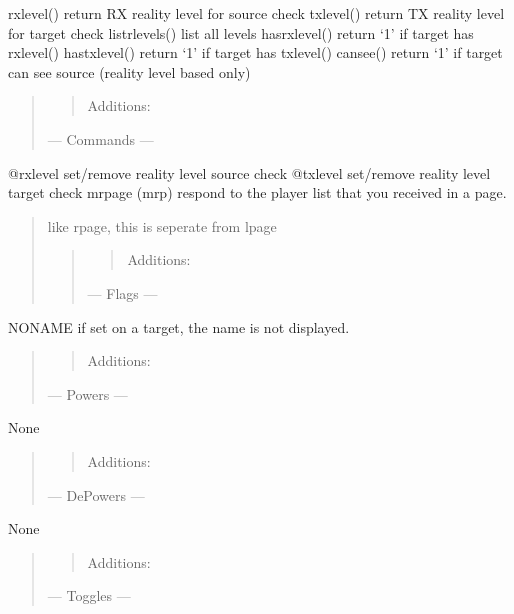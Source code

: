 \documentclass[letterpaper,10pt,english]{sphinxmanual}
\begin{document}
\sphinxAtStartPar
rxlevel() \sphinxhyphen{} return RX reality level for source check
txlevel() \sphinxhyphen{} return TX reality level for target check
listrlevels() \sphinxhyphen{} list all levels
hasrxlevel() \sphinxhyphen{} return ‘1’ if target has rxlevel()
hastxlevel() \sphinxhyphen{} return ‘1’ if target has txlevel()
cansee() \sphinxhyphen{} return ‘1’ if target can see source (reality level based only)
\begin{quote}
\begin{quote}

\sphinxAtStartPar
Additions:
\end{quote}

\sphinxAtStartPar
— Commands —
\end{quote}

\sphinxAtStartPar
@rxlevel \sphinxhyphen{} set/remove reality level source check
@txlevel \sphinxhyphen{} set/remove reality level target check
mrpage (mrp) \sphinxhyphen{} respond to the player list that you received in a page.
\begin{quote}

\sphinxAtStartPar
like rpage, this is seperate from lpage
\begin{quote}
\begin{quote}

\sphinxAtStartPar
Additions:
\end{quote}

\sphinxAtStartPar
— Flags —
\end{quote}
\end{quote}

\sphinxAtStartPar
NONAME \sphinxhyphen{} if set on a target, the name is not displayed.
\begin{quote}
\begin{quote}

\sphinxAtStartPar
Additions:
\end{quote}

\sphinxAtStartPar
— Powers —
\end{quote}

\sphinxAtStartPar
None
\begin{quote}
\begin{quote}

\sphinxAtStartPar
Additions:
\end{quote}

\sphinxAtStartPar
— De\sphinxhyphen{}Powers —
\end{quote}

\sphinxAtStartPar
None
\begin{quote}
\begin{quote}

\sphinxAtStartPar
Additions:
\end{quote}

\sphinxAtStartPar
— Toggles —
\end{quote}
\end{document}
